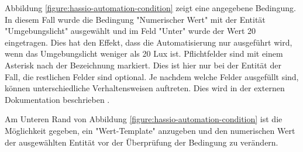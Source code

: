 Abbildung \ref{figure:hassio-automation-condition} zeigt eine angegebene Bedingung. In diesem Fall wurde  die Bedingung "Numerischer Wert" mit der Entität "Umgebungslicht" ausgewählt und im Feld "Unter" wurde der Wert 20 eingetragen. Dies hat den Effekt, dass die Automatisierung nur ausgeführt wird, wenn das Umgebungslicht weniger als 20 Lux ist. Pflichtfelder sind mit einem Asterisk nach der Bezeichnung markiert. Dies ist hier nur bei der Entität der Fall, die restlichen Felder sind optional. Je nachdem welche Felder ausgefüllt sind, können unterschiedliche Verhaltensweisen auftreten. Dies wird in der externen Dokumentation beschrieben \parencite{homeassistantConditions}.

Am Unteren Rand von Abbildung \ref{figure:hassio-automation-condition} ist die Möglichkeit gegeben, ein "Wert-Template" anzugeben und den numerischen Wert der ausgewählten Entität vor der Überprüfung der Bedingung zu verändern.

